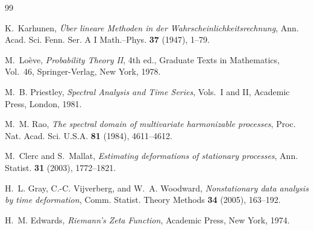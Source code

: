 \documentclass[11pt]{amsart}
\theoremstyle{definition}
\begin{document}
\begin{thebibliography}{99}

 K.~Karhunen, \emph{\"Uber lineare Methoden in der
Wahrscheinlichkeitsrechnung}, Ann. Acad. Sci. Fenn. Ser. A I Math.--Phys.
\textbf{37} (1947), 1--79.

 M.~Lo\`eve, \emph{Probability Theory II}, 4th ed.,
Graduate Texts in Mathematics, Vol.~46, Springer-Verlag, New York, 1978.

 M.~B. Priestley, \emph{Spectral Analysis and
Time Series}, Vols.~I and II, Academic Press, London, 1981.

 M.~M. Rao, \emph{The spectral domain of multivariate
harmonizable processes}, Proc. Nat. Acad. Sci. U.S.A. \textbf{81} (1984),
4611--4612.

 M.~Clerc and S.~Mallat, \emph{Estimating
deformations of stationary processes}, Ann. Statist. \textbf{31}
(2003), 1772--1821.

 H.~L. Gray, C.-C. Vijverberg, and W.~A.
Woodward, \emph{Nonstationary data analysis by time deformation},
Comm. Statist. Theory Methods \textbf{34} (2005), 163--192.

 H.~M. Edwards, \emph{Riemann's Zeta Function}, Academic
Press, New York, 1974.

\end{thebibliography}
\end{document}
